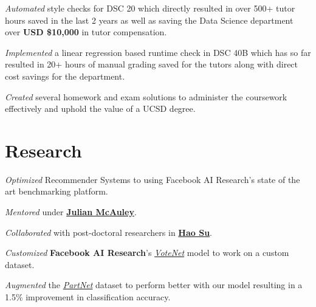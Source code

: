 \documentclass[]{deedy-resume-openfont}
\begin{document}
\begin{minipage}[t]{0.66\textwidth}
\vspace{\topsep} %
\begin{tightemize}
\item \emph{Automated} style checks for DSC 20 which directly resulted in over
    500+ tutor hours saved in the last 2 years as well as saving the Data
    Science department over \textbf{USD \$10,000} in tutor compensation.
\item \emph{Implemented} a linear regression based runtime check in DSC 40B which has so far resulted in 20+ hours of manual grading saved for the tutors along with direct cost savings for the department.
\item \emph{Created} several homework and exam solutions to administer the coursework effectively and uphold the value of a UCSD degree.
\end{tightemize}
\sectionsep

\section{Research}
\begin{tightemize}
\item \emph{Optimized} Recommender Systems to using Facebook AI Research's
    state of the art benchmarking platform.
\item \emph{Mentored} under
    \textbf{\href{https://scholar.google.com/citations?user=icbo4M0AAAAJ&hl=en}{Julian McAuley}}.
\end{tightemize}
\sectionsep

\begin{tightemize}
\item \emph{Collaborated} with post-doctoral researchers in \textbf{\href{https://scholar.google.com/citations?user=1P8Zu04AAAAJ}{Hao Su}}.
\item \emph{Customized} \textbf{Facebook AI Research}'s \emph{\href{https://arxiv.org/abs/1904.09664}{VoteNet}} model to work on a custom dataset.
\item \emph{Augmented} the
    \emph{\href{https://cs.stanford.edu/~kaichun/partnet/}{PartNet}} dataset to
    perform better with our model resulting in a 1.5\% improvement in classification accuracy.
\end{tightemize}
\sectionsep


\end{minipage}
\end{document}
